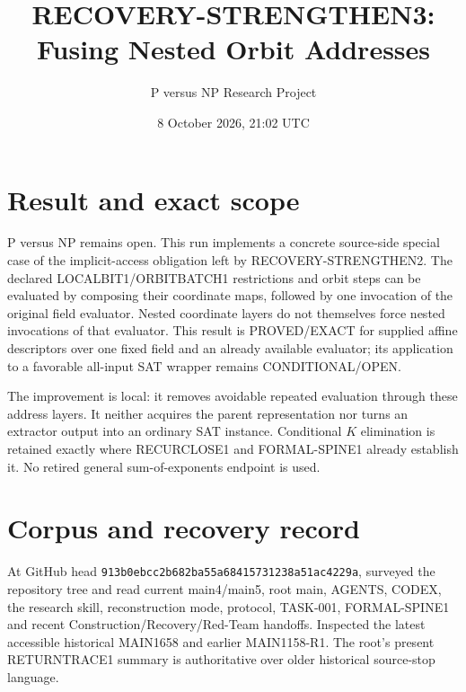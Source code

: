\documentclass[11pt]{article}
\title{RECOVERY-STRENGTHEN3: Fusing Nested Orbit Addresses}
\author{P versus NP Research Project}
\date{8 October 2026, 21:02 UTC}
\begin{document}
\maketitle

\section*{Result and exact scope}
P versus NP remains open. This run implements a concrete source-side
special case of the implicit-access obligation left by RECOVERY-STRENGTHEN2.
The declared LOCALBIT1/ORBITBATCH1 restrictions and orbit steps can be
evaluated by composing their coordinate maps, followed by one invocation
of the original field evaluator. Nested coordinate layers do not themselves
force nested invocations of that evaluator. This result is PROVED/EXACT
for supplied affine descriptors over one fixed field and an already
available evaluator; its application to a favorable all-input SAT wrapper
remains CONDITIONAL/OPEN.

The improvement is local: it removes avoidable repeated evaluation through
these address layers. It neither acquires the parent representation nor
turns an extractor output into an ordinary SAT instance. Conditional
$K$ elimination is retained exactly where RECURCLOSE1 and FORMAL-SPINE1
already establish it. No retired general sum-of-exponents endpoint is used.

\section*{Corpus and recovery record}
At GitHub head \nolinkurl{913b0ebcc2b682ba55a68415731238a51ac4229a},
surveyed the repository tree and read current main4/main5, root main,
AGENTS, CODEX, the research skill, reconstruction mode, protocol,
TASK-001, FORMAL-SPINE1 and recent Construction/Recovery/Red-Team handoffs.
Inspected the latest accessible historical MAIN1658 and earlier MAIN1158-R1.
The root's present RETURNTRACE1 summary is authoritative over older
historical source-stop language.
\end{document}
